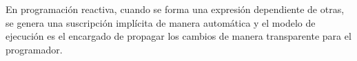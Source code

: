 En programación reactiva, cuando se forma una expresión dependiente de otras, se
genera una suscripción implícita de manera automática y el modelo de ejecución
es el encargado de propagar los cambios de manera transparente para el
programador.

\textbf{\color{red}{QUÉ HACEMOS CON CHIMP COMO MODELO DE EJECUCIÓN REACTIVA? NO CREO QUE VAYA ACÁ}}
